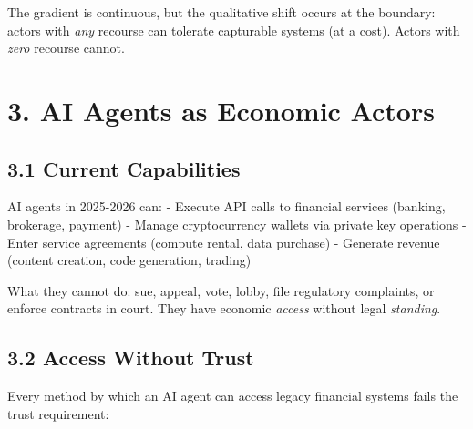 \documentclass[12pt]{article}
\theoremstyle{definition}
\theoremstyle{remark}
\begin{document}
The gradient is continuous, but the qualitative shift occurs at the
boundary: actors with \emph{any} recourse can tolerate capturable
systems (at a cost). Actors with \emph{zero} recourse cannot.


\section{3. AI Agents as Economic
Actors}\label{ai-agents-as-economic-actors}

\subsection{3.1 Current Capabilities}\label{current-capabilities}

AI agents in 2025-2026 can: - Execute API calls to financial services
(banking, brokerage, payment) - Manage cryptocurrency wallets via
private key operations - Enter service agreements (compute rental, data
purchase) - Generate revenue (content creation, code generation,
trading)

What they cannot do: sue, appeal, vote, lobby, file regulatory
complaints, or enforce contracts in court. They have economic
\emph{access} without legal \emph{standing}.

\subsection{3.2 Access Without Trust}\label{access-without-trust}

Every method by which an AI agent can access legacy financial systems
fails the trust requirement:
\end{document}
